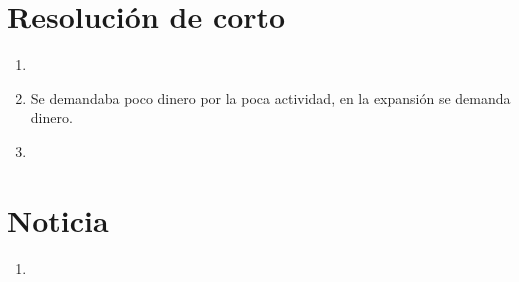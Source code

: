 \section{Resolución de corto}
\begin{enumerate}
    \item 
    \item Se demandaba poco dinero por la poca actividad, en la expansión se demanda dinero.
    \item 
\end{enumerate}


\section{Noticia}
\begin{enumerate}
    \item 
\end{enumerate}

